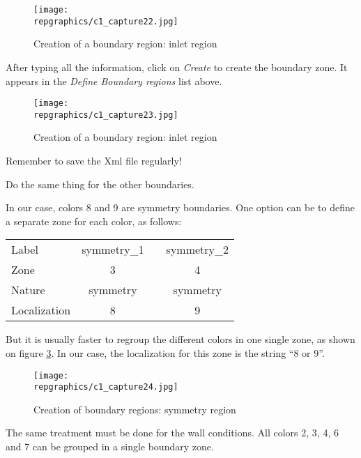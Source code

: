 \begin{figure}[ht]
\begin{center}
\texttt{[image: \\repgraphics/c1\_capture22.jpg]}
\caption{Creation of a boundary region: inlet region}
\label{fig22_e1}
\end{center}
\end{figure}



\clearpage
After typing all the information, click on {\itshape Create} to
create the boundary zone. It appears in the
{\itshape Define Boundary regions} list above.

\begin{figure}[ht]
\begin{center}
\texttt{[image: \\repgraphics/c1\_capture23.jpg]}
\caption{Creation of a boundary region: inlet region}
\label{fig23_e1}
\end{center}
\end{figure}

Remember to save the Xml file regularly!


\clearpage
Do the same thing for the other boundaries.

In our case, colors 8 and 9 are symmetry boundaries. One option can be to define
a separate zone for each color, as follows:
\begin{center}
\begin{tabular}{lcp{2cm}c}
Label & symmetry\_1 & & symmetry\_2 \\
Zone & 3 & & 4 \\
Nature & symmetry & & symmetry \\
Localization & 8 & & 9 \\
\end{tabular}
\end{center}

But it is usually faster to regroup the different colors in one single zone, as
shown on figure \ref{fig24_e1}. In our case, the localization for this zone is
the string ``8 or 9''.

\begin{figure}[ht]
\begin{center}
\texttt{[image: \\repgraphics/c1\_capture24.jpg]}
\caption{Creation of boundary regions: symmetry region}
\label{fig24_e1}
\end{center}
\end{figure}


\clearpage
The same treatment must be done for the wall conditions. All colors 2, 3, 4, 6
and 7 can be grouped in a single boundary zone.


